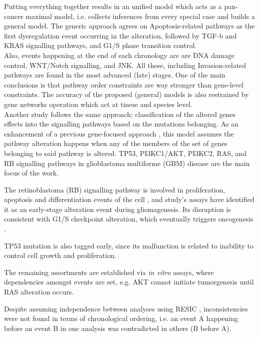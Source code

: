 Putting everything together results in an unified model which acts as a pan-cancer maximal model, i.e. collects inferences from every special case and builds a general model. The generic approach agrees on Apoptosis-related pathways as the first dysregulation event occurring in the alteration, followed by TGF-b and KRAS signalling pathways, and G1/S phase transition control. \\
Also, events happening at the end of each chronology are are DNA damage control, WNT/Notch signalling, and JNK. All these, including Invasion-related pathways are found in the most advanced (late) stages.
One of the main conclusions is that pathway order constraints are way stronger than gene-level constraints.
The accuracy of the proposed (general) models is also restrained by gene networks operation which act at tissue and species level.
\\

Another study \cite{Cheng2012AGliomagenesis} follows the same approach: classification of the altered genes effects into the signalling pathways based on the mutations belonging. As an enhancement of a previous gene-focused approach \cite{Attolini2010ACancer}, this model assumes the pathway alteration happens when any of the members of the set of genes belonging to said pathway is altered. TP53, PI3KC1/AKT, PI3KC2, RAS, and RB signalling pathways in glioblastoma multiforme (GBM) disease are the main focus of the work.

The retinoblastoma (RB) signalling pathway is involved in proliferation, apoptosis and differentiation events of the cell \cite{Du2012TheTherapeutics}, and study's assays have identified it as an early-stage alteration event during gliomagenesis. Its disruption is consistent with G1/S checkpoint alteration, which eventually triggers oncogenesis \cite{Bertoli2013ControlPhases}.

TP53 mutation is also tagged early, since its malfunction is related to inability to control cell growth and proliferation.

The remaining assortments are established via \emph{in vitro} assays, where dependencies amongst events are set, e.g. AKT cannot initiate tumorgenesis until RAS alteration occurs.

Despite assuming independence between analyses using RESIC \cite{Attolini2010ACancer}, inconsistencies were not found in terms of chronological ordering, i.e. an event A happening before an event B in one analysis was contradicted in others (B before A).
\\

